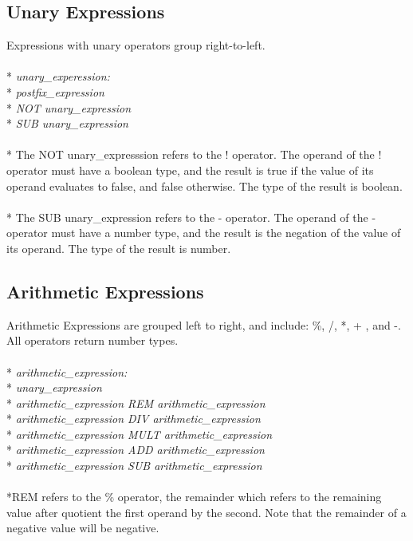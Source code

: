 \subsection{Unary Expressions}
Expressions with unary operators group right-to-left.
\\ \\* \tab \emph{unary\_experession:}
\\* \tab \tab \emph{postfix\_expression}
\\* \tab \tab \emph{NOT unary\_expression}
\\* \tab \tab \emph{SUB unary\_expression}
\\ \\* The NOT unary\_expresssion refers to the ! operator. The operand of the !
operator must have a boolean type, and the result is true if the value of its
operand evaluates to false, and false otherwise. The type of the result is
boolean.
\\ \\* The SUB unary\_expression refers to the - operator. The operand of the -
operator must have a number type, and the result is the negation of the value of
its operand. The type of the result is number.

\subsection{Arithmetic Expressions}
Arithmetic Expressions are grouped left to right, and include: \%, /, *, + , and
-.
All operators return number types.
\\ \\* \tab \emph{arithmetic\_expression:}
\\* \tab \tab \emph{unary\_expression}
\\* \tab \tab \emph{arithmetic\_expression REM arithmetic\_expression}
\\* \tab \tab \emph{arithmetic\_expression DIV arithmetic\_expression}
\\* \tab \tab \emph{arithmetic\_expression MULT arithmetic\_expression}
\\* \tab \tab \emph{arithmetic\_expression ADD arithmetic\_expression}
\\* \tab \tab \emph{arithmetic\_expression SUB arithmetic\_expression}
\\ \\*REM refers to the \% operator, the remainder which refers to the remaining
value after quotient the first operand by the second. Note that the remainder of
a negative value will be negative.

